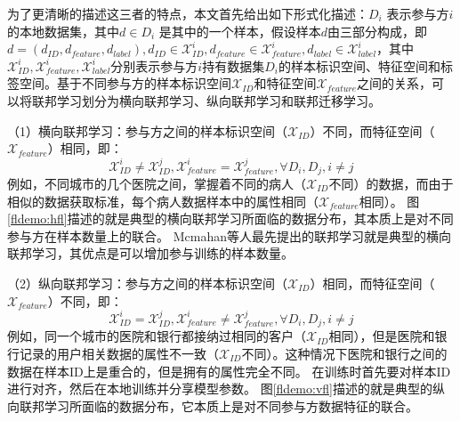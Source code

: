 为了更清晰的描述这三者的特点，本文首先给出如下形式化描述：${D}_i$ 表示参与方$i$的本地数据集，其中$d \in {D}_i$ 是其中的一个样本，假设样本$d$由三部分构成，即$d = (d_{ID}, d_{feature}, d_{label}), d_{ID} \in \mathcal{X}^i_{ID}, d_{feature} \in \mathcal{X}^i_{feature}, d_{label} \in \mathcal{X}^i_{label}$，其中$\mathcal{X}^i_{ID}, \mathcal{X}^i_{feature}, \mathcal{X}^i_{label}$分别表示参与方$i$持有数据集${D}_i$的样本标识空间、特征空间和标签空间。基于不同参与方的样本标识空间$\mathcal{X}_{ID}$和特征空间$\mathcal{X}_{feature}$之间的关系，可以将联邦学习划分为横向联邦学习、纵向联邦学习和联邦迁移学习。

%
%

（1）横向联邦学习：参与方之间的样本标识空间（$\mathcal{X}_{ID}$）不同，而特征空间（$\mathcal{X}_{feature}$）相同，即：
\begin{equation}
	\mathcal{X}_{ID}^i \neq \mathcal{X}_{ID}^j, \mathcal{X}_{feature}^i=\mathcal{X}_{feature}^j , \forall {D}_i, {D}_j, i \neq j
\end{equation}
例如，不同城市的几个医院之间，掌握着不同的病人（$\mathcal{X}_{ID}$不同）的数据，而由于相似的数据获取标准，每个病人数据样本中的属性相同（$\mathcal{X}_{feature}$相同）。
图\ref{fldemo:hfl}描述的就是典型的横向联邦学习所面临的数据分布，其本质上是对不同参与方在样本数量上的联合。
Mcmahan等人\cite{mcmahan2017communication}最先提出的联邦学习就是典型的横向联邦学习，其优点是可以增加参与训练的样本数量。

（2）纵向联邦学习：参与方之间的样本标识空间（$\mathcal{X}_{ID}$）相同，而特征空间（$\mathcal{X}_{feature}$）不同，即：
\begin{equation}
	\mathcal{X}_{ID}^i = \mathcal{X}_{ID}^j, \mathcal{X}_{feature}^i \neq \mathcal{X}_{feature}^j , \forall {D}_i, {D}_j, i \neq j
\end{equation}
例如，同一个城市的医院和银行都接纳过相同的客户（$\mathcal{X}_{ID}$相同），但是医院和银行记录的用户相关数据的属性不一致（$\mathcal{X}_{ID}$不同）。这种情况下医院和银行之间的数据在样本ID上是重合的，但是拥有的属性完全不同。
在训练时首先要对样本ID进行对齐，然后在本地训练并分享模型参数。
图\ref{fldemo:vfl}描述的就是典型的纵向联邦学习所面临的数据分布，它本质上是对不同参与方数据特征的联合。

